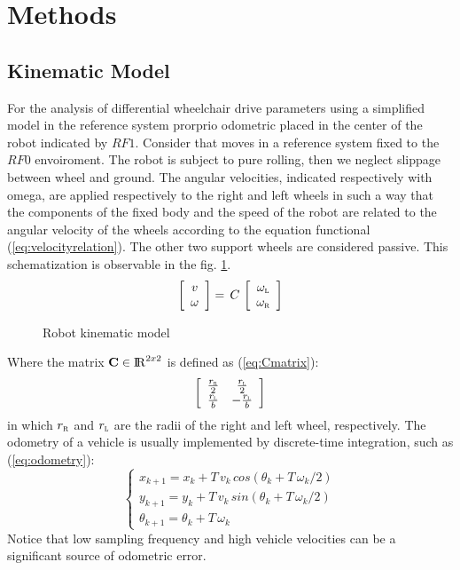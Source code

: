 \section{Methods}
\subsection{Kinematic Model}
For the analysis of differential wheelchair drive parameters using a simplified model in the reference system prorprio odometric placed in the center of the robot indicated by $RF1$. Consider that moves in a reference system fixed to the $RF0$ envoiroment.
The robot is subject to pure rolling, then we neglect slippage between wheel and ground. The angular velocities, indicated respectively with omega, are applied respectively to the right and left wheels in such a way that the components of the fixed body and the speed of the robot are related to the angular velocity of the wheels according to the equation functional (\ref{eq:velocityrelation}).
The other two support wheels are considered passive. This schematization is observable in the fig. \ref{fig:model}.
\begin{equation}
\label{eq:velocityrelation}
	\left[ \begin{array}{cc}
				v	\\									
				\omega 							
			 \end{array} 
	\right]  =\, C\,
	\left[ \begin{array}{cc}
 				\omega_\textsc{l} \\ 
				\omega_\textsc{r}
			 \end{array} 
	\right]
\end{equation}

\begin{figure}[!h]
\centering
    \resizebox{.8\linewidth}{!}{}
\caption{Robot kinematic model}
\label{fig:model}
\end{figure}
\noindent Where the matrix $\textbf{C} \in \operatorname{\rm I\!R}^{2 x 2}$ is defined as (\ref{eq:Cmatrix}):
\begin{equation}
\label{eq:Cmatrix}
	\left[ \begin{array}{cc}
 				\frac{r_\textsc{r}}{2} &	\frac{r_\textsc{l}}{2} \\
				\frac{r_\textsc{l}}{b} &	-\frac{r_\textsc{l}}{b} 
			 \end{array} 
	\right]
\end{equation}
in which $r_\textsc{r}$ and $r_\textsc{l}$ are the radii of the right and left wheel, respectively.
The odometry of a vehicle is usually implemented by discrete-time integration, such as (\ref{eq:odometry}):
\begin{equation}
\label{eq:odometry}
	\begin{cases}
		x_{k+1} = x_{k} + T \, v_{k} \, cos(\theta_{k} + T \,\omega_{k}/2)\\
		y_{k+1} = y_{k} + T \, v_{k} \, sin(\theta_{k} + T \, \omega_{k}/2)\\
		\theta_{k+1} = \theta_{k} + T \, \omega_{k}
	\end{cases}
\end{equation}           
Notice that low sampling frequency and high vehicle velocities can be a significant source of odometric error.

